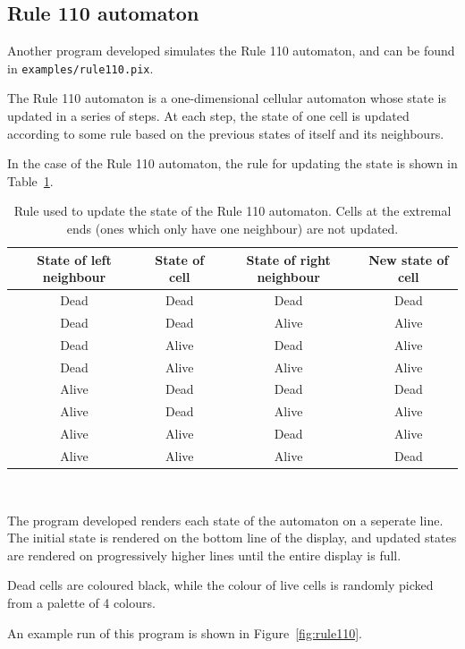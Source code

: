 \documentclass[11pt,a4paper]{scrartcl}
\begin{document}
\subsection{Rule 110 automaton}

Another program developed simulates the Rule 110 automaton, and can be found in \verb|examples/rule110.pix|.

The Rule 110 automaton is a one-dimensional cellular automaton\cite{wolfram2002} whose state is updated in a series of steps. At each step, the state of one cell is updated according to some rule based on the previous states of itself and its neighbours.

In the case of the Rule 110 automaton, the rule for updating the state is shown in Table~\ref{tab:rule-110}.

\begin{table}[!h]
  \centering
  \begin{tabular}{|c|c|c|c|}
    \hline
    State of left neighbour & State of cell & State of right neighbour & New state of cell \\\hline\hline
    Dead & Dead & Dead & Dead \\ \hline
    Dead & Dead & Alive & Alive \\ \hline
    Dead & Alive & Dead & Alive \\ \hline
    Dead & Alive & Alive & Alive \\ \hline
    Alive & Dead & Dead & Dead \\ \hline
    Alive & Dead & Alive & Alive \\ \hline
    Alive & Alive & Dead & Alive \\ \hline
    Alive & Alive & Alive & Dead \\ \hline
  \end{tabular}
  \caption{Rule used to update the state of the Rule 110 automaton. Cells at the extremal ends (ones which only have one neighbour) are not updated.}~\label{tab:rule-110}
\end{table}

The program developed renders each state of the automaton on a seperate line. The initial state is rendered on the bottom line of the display, and updated states are rendered on progressively higher lines until the entire display is full.

Dead cells are coloured black, while the colour of live cells is randomly picked from a palette of 4 colours.

An example run of this program is shown in Figure~\ref{fig:rule110}.
\end{document}

